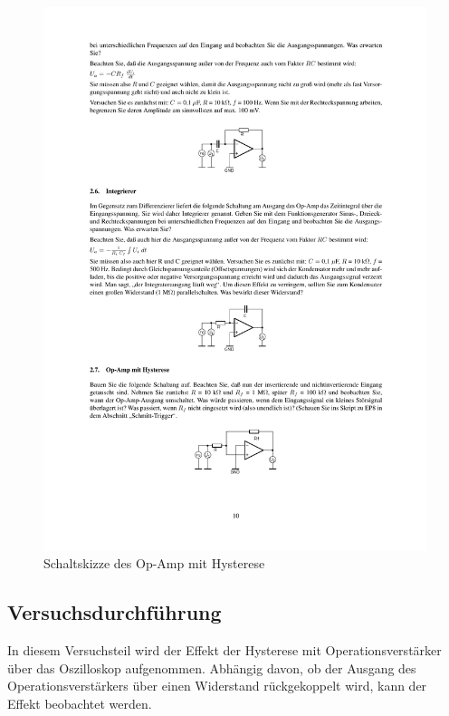 \documentclass[12pt,a4paper]{article}
\begin{document}
\begin{figure}[H] 
  \centering
    \includegraphics[trim = 10mm 40mm 10mm 230mm, clip, scale = 1]{ep4_14[Page10].pdf}
  	\caption[Schaltskizze des Op-Amp mit Hysterese]{Schaltskizze des Op-Amp mit Hysterese\footnotemark}
  \label{fig:1}
\end{figure}

\subsection{Versuchsdurchführung}
In diesem Versuchsteil wird der Effekt der Hysterese mit Operationsverstärker über das Oszilloskop aufgenommen. Abhängig davon, ob der Ausgang des Operationsverstärkers über einen Widerstand rückgekoppelt wird, kann der Effekt beobachtet werden.
\end{document}
